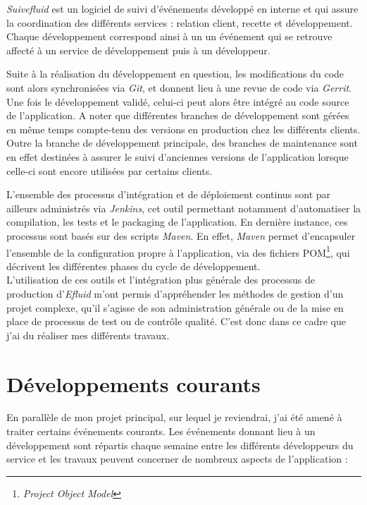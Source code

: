 \documentclass[a4paper, 12pt]{report}
\begin{document}
\textit{Suivefluid} est un logiciel de suivi d'événements développé en interne et qui assure la coordination des différents services : relation client, recette et développement. Chaque développement correspond ainsi à un un événement qui se retrouve affecté à un service de développement puis à un développeur.

Suite à la réalisation du développement en question, les modifications du code sont alors synchronisées via \textit{Git}, et donnent lieu à une revue de code via \textit{Gerrit}. Une fois le développement validé, celui-ci peut alors être intégré au code source de l'application. A noter que différentes branches de développement sont gérées en même temps compte-tenu des versions en production chez les différents clients. Outre la branche de développement principale, des branches de maintenance sont en effet destinées à assurer le suivi d'anciennes versions de l'application lorsque celle-ci sont encore utilisées par certains clients.

L'ensemble des processus d'intégration et de déploiement continus sont par ailleurs administrés via \textit{Jenkins}, cet outil permettant notamment d'automatiser la compilation, les tests et le packaging de l'application. En dernière instance, ces processus sont basés sur des scripts \textit{Maven}. En effet, \textit{Maven} permet d'encapsuler l'ensemble de la configuration propre à l'application, via des fichiers POM\footnote{\textit{Project Object Model}}, qui décrivent les différentes phases du cycle de développement.\\

L'utilisation de ces outils et l'intégration plus générale des processus de production d'\textit{Efluid} m'ont permis d'appréhender les méthodes de gestion d'un projet complexe, qu'il s'agisse de son administration générale ou de la mise en place de processus de test ou de contrôle qualité. C'est donc dans ce cadre que j'ai du réaliser mes différents travaux.

\section{Développements courants}

En parallèle de mon projet principal, sur lequel je reviendrai, j'ai été amené à traiter certains événements courants. Les événements donnant lieu à un développement sont répartis chaque semaine entre les différents développeurs du service et les travaux peuvent concerner de nombreux aspects de l'application : \\
\end{document}
